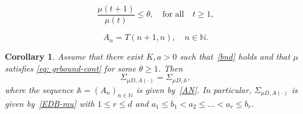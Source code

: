 \documentclass[10pt,a4paper]{amsart}
\newtheorem{corollary}{Corollary}
\def\N{\mathbb{N}}
\begin{document}
\begin{equation}
	\frac{\mu(t+1)}{\mu (t)}\le \theta, \quad \text{for all} \quad t\geq 1,
\end{equation} 

\begin{equation}
A_n=T(n+1, n), \quad n\in \N.
\end{equation}

\begin{corollary}\label{cor: equal spectrum cont}
Assume that there exist $K, a>0$ such that~\eqref{bnd} holds and that $\mu$ satisfies \eqref{eq: grbound-cont} for some $\theta\geq 1$. Then
\[
\Sigma_{\mu D, A(\cdot)}=\Sigma_{\mu D, \mathbb A},
\]
where the sequence $\mathbb A=(A_n)_{n\in \N}$ is given by~\eqref{AN}. In particular, $\Sigma_{\mu D, A(\cdot)}$ is given by~\eqref{EDB-mu} with $1\leq r\le d$ and $a_1\leq b_1<a_2\leq \ldots < a_r\leq b_r$.
\end{corollary}
\end{document}
